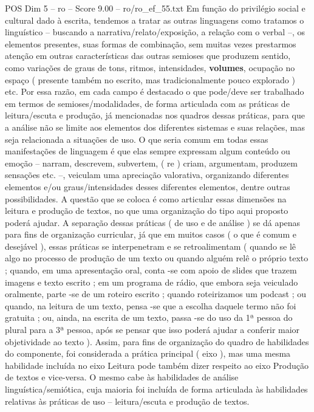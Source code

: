 \begin{textsample}{POS Dim 5 – ro – Score 9.00 – ro/ro\_ef\_55.txt}  \label{ex:f5_pos_116}
Em função do privilégio social e cultural dado à escrita, tendemos a tratar as outras linguagens como tratamos o linguístico – buscando a narrativa/relato/exposição, a relação com o verbal –, os elementos presentes, suas formas de combinação, sem muitas vezes prestarmos atenção em outras características das outras semioses que produzem sentido, como variações de graus de tons, ritmos, intensidades, \textbf{volumes}, ocupação no espaço ( presente também no escrito, mas tradicionalmente pouco explorado ) etc.
Por essa razão, em cada campo é destacado o que pode/deve ser trabalhado em termos de semioses/modalidades, de forma articulada com as práticas de leitura/escuta e produção, já mencionadas nos quadros dessas práticas, para que a análise não se limite aos elementos dos diferentes sistemas e suas relações, mas seja relacionada a situações de uso.
O que seria comum em todas essas manifestações de linguagem é que elas sempre expressam algum conteúdo ou emoção – narram, descrevem, subvertem, ( re ) criam, argumentam, produzem sensações etc. –, veiculam uma apreciação valorativa, organizando diferentes elementos e/ou graus/intensidades desses diferentes elementos, dentre outras possibilidades.
A questão que se coloca é como articular essas dimensões na leitura e produção de textos, no que uma organização do tipo aqui proposto poderá ajudar.
A separação dessas práticas ( de uso e de análise ) se dá apenas para fins de organização curricular, já que em muitos casos ( o que é comum e desejável ), essas práticas se interpenetram e se retroalimentam ( quando se lê algo no processo de produção de um texto ou quando alguém relê o próprio texto ; quando, em uma apresentação oral, conta -se com apoio de slides que trazem imagens e texto escrito ; em um programa de rádio, que embora seja veiculado oralmente, parte -se de um roteiro escrito ; quando roteirizamos um podcast ; ou quando, na leitura de um texto, pensa -se que a escolha daquele termo não foi gratuita ; ou, ainda, na escrita de um texto, passa -se do uso da 1ª pessoa do plural para a 3ª pessoa, após se pensar que isso poderá ajudar a conferir maior objetividade ao texto ).
Assim, para fins de organização do quadro de habilidades do componente, foi considerada a prática principal ( eixo ), mas uma mesma habilidade incluída no eixo Leitura pode também dizer respeito ao eixo Produção de textos e vice-versa.
O mesmo cabe às habilidades de análise linguística/semiótica, cuja maioria foi incluída de forma articulada às habilidades relativas às práticas de uso – leitura/escuta e produção de textos.

\end{textsample}
